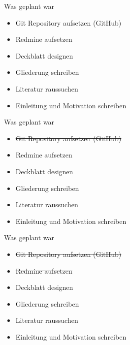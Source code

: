 \documentclass{beamer}
\institute{Universität Hamburg -- Fachbereich Informatik -- Abschlussarbeiten Seminar}
\date{\today}
\title{\myTitle}
\author{\myName}
\begin{document}
{
    \frame{
        \titlepage
    }
}

\begin{frame}{Was geplant war}
  \begin{itemize}
    \item Git Repository aufsetzen (GitHub)
    \item Redmine aufsetzen
    \item Deckblatt designen
    \item Gliederung schreiben
    \item Literatur raussuchen
    \item Einleitung und Motivation schreiben
  \end{itemize}
\end{frame}

\begin{frame}{Was geplant war}
  \begin{itemize}
    \item \sout{Git Repository aufsetzen (GitHub)}
    \item Redmine aufsetzen
    \item Deckblatt designen
    \item Gliederung schreiben
    \item Literatur raussuchen
    \item Einleitung und Motivation schreiben
  \end{itemize}
\end{frame}

\begin{frame}{Was geplant war}
  \begin{itemize}
    \item \sout{Git Repository aufsetzen (GitHub)}
    \item \sout{Redmine aufsetzen}
    \item Deckblatt designen
    \item Gliederung schreiben
    \item Literatur raussuchen
    \item Einleitung und Motivation schreiben
  \end{itemize}
\end{frame}
\end{document}
